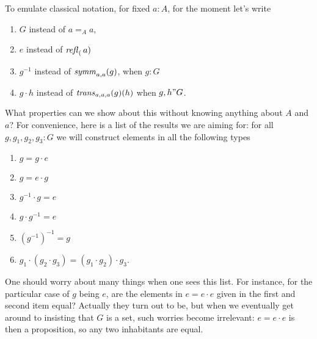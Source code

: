  To emulate classical notation, for fixed $a:A$,  for the moment let's write 
 \begin{enumerate}
 \item $G$ instead of $a=_Aa$,
 \item $e$ instead of $\mathop{{\it refl}_{(}}a)$
 \item $g^{-1}$ instead of $\mathop{\mathit{symm}}_{a,a}(g)$, when $g:G$
 \item $g\cdot h$ instead of $\mathop{\mathit{trans}}_{a,a,a}(g)(h)$ when $g,h"G$.
 \end{enumerate}
 What properties can we show about this without knowing anything about $A$ and $a$? For convenience, here is a list of the results we are aiming for: for all $g,g_1,g_2,g_3:G$ we will construct elements in all the following types 
 \begin{enumerate}
 \item $g=g\cdot e$
 \item $g=e\cdot g$
 \item $g^{-1}\cdot g=e$
 \item $g\cdot g^{-1}=e$
 \item $(g^{-1})^{-1}=g$
 \item $g_1\cdot(g_2\cdot g_3)=(g_1\cdot g_2)\cdot g_3$.
 \end{enumerate}
 \begin{remark}
   One should worry about many things when one sees this list.  For instance, for the particular case of $g$ being $e$, are the elements in $e=e\cdot e$ given in the first and second item equal?  Actually they turn out to be, but when we eventually get around to insisting that $G$ is a set, such worries become irrelevant: $e=e\cdot e$ is then a proposition, so any two inhabitants are equal.
 \end{remark}


